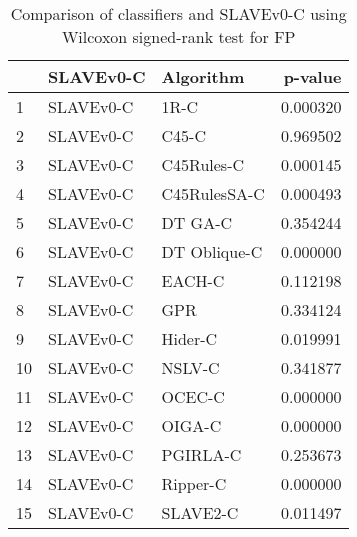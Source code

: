 \begin{table}
\footnotesize
\caption{Comparison of classifiers and SLAVEv0-C using Wilcoxon signed-rank test for FP}
\label{tab:SLAVEv0-C wilcoxon FP comparison}
\begin{tabular}{lllr}
\hline
 & SLAVEv0-C & Algorithm & p-value \\
\hline
1 & SLAVEv0-C & 1R-C & 0.000320 \\
2 & SLAVEv0-C & C45-C & 0.969502 \\
3 & SLAVEv0-C & C45Rules-C & 0.000145 \\
4 & SLAVEv0-C & C45RulesSA-C & 0.000493 \\
5 & SLAVEv0-C & DT GA-C & 0.354244 \\
6 & SLAVEv0-C & DT Oblique-C & 0.000000 \\
7 & SLAVEv0-C & EACH-C & 0.112198 \\
8 & SLAVEv0-C & GPR & 0.334124 \\
9 & SLAVEv0-C & Hider-C & 0.019991 \\
10 & SLAVEv0-C & NSLV-C & 0.341877 \\
11 & SLAVEv0-C & OCEC-C & 0.000000 \\
12 & SLAVEv0-C & OIGA-C & 0.000000 \\
13 & SLAVEv0-C & PGIRLA-C & 0.253673 \\
14 & SLAVEv0-C & Ripper-C & 0.000000 \\
15 & SLAVEv0-C & SLAVE2-C & 0.011497 \\
\hline
\end{tabular}
\end{table}
